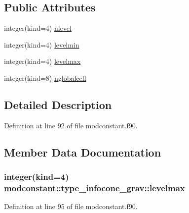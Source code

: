 \subsection*{Public Attributes}
\begin{DoxyCompactItemize}
\item 
integer(kind=4) \hyperlink{structmodconstant_1_1type__infocone__grav_a711b971de6fe902d47b0c0d562f27669}{nlevel}
\item 
integer(kind=4) \hyperlink{structmodconstant_1_1type__infocone__grav_a81f217da97c48e4dcc063b03cad14fb4}{levelmin}
\item 
integer(kind=4) \hyperlink{structmodconstant_1_1type__infocone__grav_a121e4e0b624c65a97c286b53526ded66}{levelmax}
\item 
integer(kind=8) \hyperlink{structmodconstant_1_1type__infocone__grav_abad2550433b2e48e7e4b82ad05021b80}{nglobalcell}
\end{DoxyCompactItemize}


\subsection{Detailed Description}


Definition at line 92 of file modconstant.\+f90.



\subsection{Member Data Documentation}
\subsubsection[{\texorpdfstring{levelmax}{levelmax}}]{\setlength{\rightskip}{0pt plus 5cm}integer(kind=4) modconstant\+::type\+\_\+infocone\+\_\+grav\+::levelmax}\hypertarget{structmodconstant_1_1type__infocone__grav_a121e4e0b624c65a97c286b53526ded66}{}\label{structmodconstant_1_1type__infocone__grav_a121e4e0b624c65a97c286b53526ded66}


Definition at line 95 of file modconstant.\+f90.

